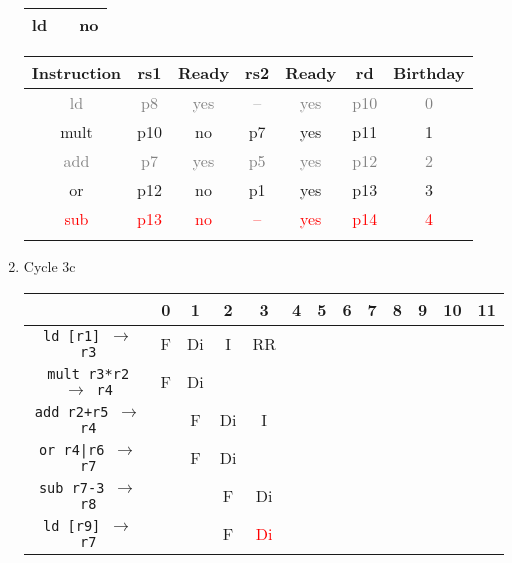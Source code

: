 \documentclass[12pt]{article}
\begin{document}
\begin{enumerate}
\begin{table}[H]
\begin{tabular}{|c|c|c|}
					\hline
					ld & & no\\
					\hline
				\end{tabular}
				\hfill
				\begin{tabular}{|c|c|c|c|c|c|c|}
					\hline
					Instruction & rs1 & Ready & rs2 & Ready & rd & Birthday\\
					\hline
					\textcolor{gray}{ld} & \textcolor{gray}{p8} & \textcolor{gray}{yes} & \textcolor{gray}{--} & \textcolor{gray}{yes} & \textcolor{gray}{p10} & \textcolor{gray}{0}\\
					\hline
					mult & p10 & no & p7 & yes & p11 & 1\\
					\hline
					\textcolor{gray}{add} & \textcolor{gray}{p7} & \textcolor{gray}{yes} & \textcolor{gray}{p5} & \textcolor{gray}{yes} & \textcolor{gray}{p12} & \textcolor{gray}{2}\\
					\hline
					or & p12 & no & p1 & yes & p13 & 3\\
					\hline
					\textcolor{red}{sub} & \textcolor{red}{p13} & \textcolor{red}{no} & \textcolor{red}{--} & \textcolor{red}{yes} & \textcolor{red}{p14} & \textcolor{red}{4}\\
					\hline
					 &  &  &  &  &  & \\
					\hline
				\end{tabular}
			\end{table}
		\item
			Cycle 3c
			\begin{table}[H]
				\begin{tabular}{|c|c|c|c|c|c|c|c|c|c|c|c|c|}
					\hline
					 & 0 & 1 & 2 & 3 & 4 & 5 & 6 & 7 & 8 & 9 & 10 & 11\\
					\hline
					\texttt{ld [r1] $\rightarrow$ r3} & F & Di & I & RR &  &  &  &  &  &  &  &\\
					\hline
					\texttt{mult r3*r2 $\rightarrow$ r4} & F & Di &  &  &  &  &  &  &  &  &  &\\
					\hline
					\texttt{add r2+r5 $\rightarrow$ r4} &  & F & Di & I &  &  &  &  &  &  &  &\\
					\hline
					\texttt{or r4|r6 $\rightarrow$ r7} &  & F & Di &  &  &  &  &  &  &  &  &\\
					\hline
					\texttt{sub r7-3 $\rightarrow$ r8} &  &  & F & Di &  &  &  &  &  &  &  &\\
					\hline
					\texttt{ld [r9] $\rightarrow$ r7} &  &  & F & \textcolor{red}{Di} &  &  &  &  &  &  &  &\\
					\hline 
				\end{tabular}
			\end{table}

\end{enumerate}
\end{document}
